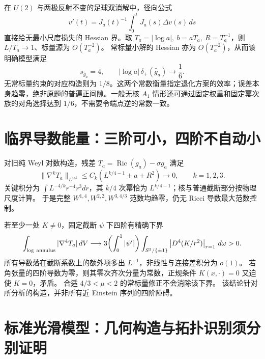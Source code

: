 \documentclass[UTF8,fontset=fandol,zihao=-4,oneside,openany]{ctexbook}
\theoremstyle{cjkplain}
\numberwithin{equation}{chapter}
\DeclareMathOperator{\Ric}{Ric}
\begin{document}
在 \(U(2)\) 与两极反射不变的足球双消解中，径向公式
\[
v'(t)=J_a(t)^{-1}\int_0^tJ_a(s)\Delta v(s)\,ds
\]
直接给无最小尺度损失的 Hessian 界。取
\(T_a=|\log a|,\ b=aT_a,\ R=T_a^{-1}\)，则
\(L/T_a\to1\)、标量源为 \(O(T_a^{-2})\)。
常标量小解的 Hessian 亦为 \(O(T_a^{-2})\)，从而该明确模型满足
\[
s_{\widehat g_a}=4,\qquad
|\log a|\,\delta_+(\widehat g_a)\longrightarrow\frac16 .
\]
无常标量约束的对应构造则为 \(1/8\)。这两个常数衡量指定退化方案的效率；误差本身趋零，绝非原题的普遍正间隙。一般无核 \(A_1\) 情形还可通过固定权重和固定幂次族的对角选择达到 \(1/6\)，不需要令端点逆的常数一致。

\section{临界导数能量：三阶可小，四阶不自动小}
对旧纯 Weyl 对数构造，残差 \(T_a=\Ric(g_a)-\sigma g_a\) 满足
\[
\|\nabla^kT_a\|_{L^{4/k}}\le
C_k(L^{k/4-1}+a+R^2)\to0,\qquad k=1,2,3.
\]
关键积分为
\(\int L^{-4/k}r^{-4}r^3dr\)，其 \(k/4\) 次幂恰为 \(L^{k/4-1}\)；核与普通截断部分按物理尺度计算。
于是完整 \(W^{1,4},W^{2,2},W^{3,4/3}\) 范数均趋零，仍无 Ricci 导数最大范数控制。

若至少一处 \(K\ne0\)，固定截断 \(\psi\) 下四阶有精确下界
\[
\int_{\rm log\ annulus}|\nabla^4T_a|\,dV
\longrightarrow
3\!\left(\int_0^1|\psi'|\right)
\int_{S^3/\{\pm1\}}\left|D^4(K/r^2)\right|_{r=1}\,d\omega>0 .
\]
所有导数落在截断系数上的额外项多出 \(L^{-1}\)，非线性与连接差积分为 \(o(1)\)。
若角张量的四阶导数为零，则其零次齐次分量为常数，正规条件
\(K(x,\cdot)=0\) 又迫使 \(K=0\)，矛盾。
合适 \(4/3<\mu<2\) 的常标量修正不会消除该下界。
该结论针对所分析的构造，并非所有近 Einstein 序列的四阶障碍。

\section{标准光滑模型：几何构造与拓扑识别须分别证明}
\label{FND:standardmodels}
\end{document}
